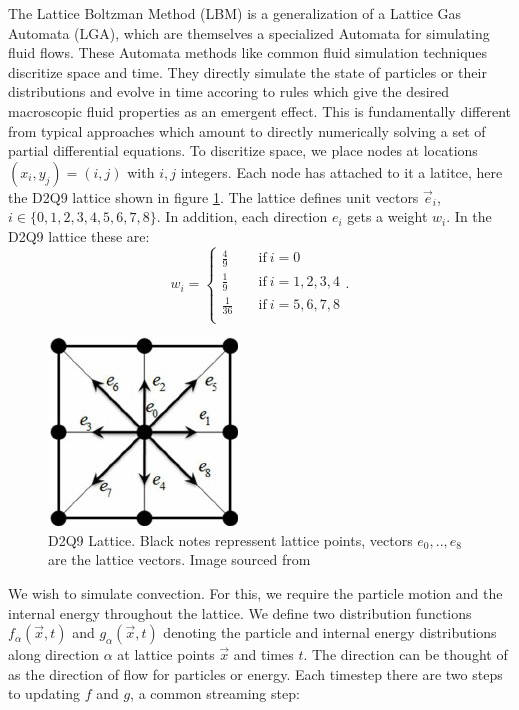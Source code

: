 \documentclass{article}
\begin{document}
\noindent The Lattice Boltzman Method (LBM) is a generalization of a Lattice Gas Automata (LGA), which are themselves a 
specialized Automata for simulating fluid flows. These Automata methods like common fluid simulation techniques 
discritize space and time. They directly simulate the state of particles or their distributions and evolve in time 
accoring to rules which give the desired macroscopic fluid properties as an emergent effect. This is fundamentally 
different from typical approaches which amount to directly numerically solving a set of partial differential equations.
\newline
\noindent To discritize space, we place nodes at locations $(x_i,y_j)=(i,j)$ with $i,j$ integers. Each node has attached to it a latitce, here the D2Q9 lattice shown in figure \ref{D2Q9}. The lattice defines unit vectors $\vec{e}_i$, $i \in \{ 0,1,2,3,4,5,6,7,8 \}$. In addition, each direction $e_i$ gets a weight $w_i$. In the D2Q9 lattice these are:
\begin{equation*}
w_i = \begin{cases}
          \frac{4}{9} \quad &\text{if}  \ i=0 \\
          \frac{1}{9} \quad &\text{if} \ i=1,2,3,4 \\
          \frac{1}{36} \quad &\text{if} \ i=5,6,7,8 \\
     \end{cases}.
\end{equation*}
\begin{figure}[h!]
	\centering
	\includegraphics{D2Q9Lattice.jpg}
	\caption{D2Q9 Lattice. Black notes repressent lattice points, vectors $e_0,..,e_8$ are the lattice vectors. Image sourced from \cite{khazaeli2015ghost}}
	\label{D2Q9}
\end{figure}
\noindent We wish to simulate convection. For this, we require the particle motion and the internal energy throughout the lattice. We define two distribution functions $f_{\alpha}(\vec{x}, t)$ and $g_{\alpha}(\vec{x}, t)$ denoting the particle and internal energy distributions along direction $\alpha$ at lattice points $\vec{x}$ and times $t$. The direction can be thought of as the direction of flow for particles or energy. Each timestep there are two steps to updating $f$ and $g$, a common streaming step:
\end{document}
